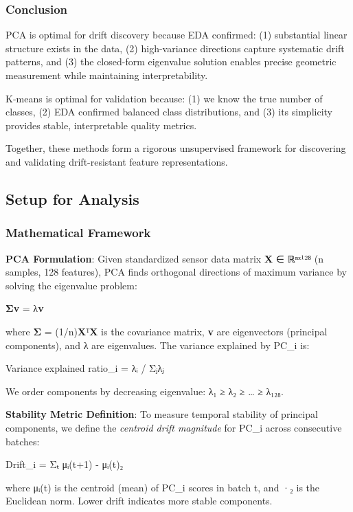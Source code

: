 \documentclass[
  letterpaper,
  DIV=11,
  numbers=noendperiod]{scrartcl}
\begin{document}
\subsubsection{Conclusion}\label{conclusion}

PCA is optimal for drift discovery because EDA confirmed: (1)
substantial linear structure exists in the data, (2) high-variance
directions capture systematic drift patterns, and (3) the closed-form
eigenvalue solution enables precise geometric measurement while
maintaining interpretability.

K-means is optimal for validation because: (1) we know the true number
of classes, (2) EDA confirmed balanced class distributions, and (3) its
simplicity provides stable, interpretable quality metrics.

Together, these methods form a rigorous unsupervised framework for
discovering and validating drift-resistant feature representations.

\subsection{Setup for Analysis}\label{setup-for-analysis}

\subsubsection{Mathematical Framework}\label{mathematical-framework}

\textbf{PCA Formulation}: Given standardized sensor data matrix
\textbf{X} ∈ ℝⁿˣ¹²⁸ (n samples, 128 features), PCA finds orthogonal
directions of maximum variance by solving the eigenvalue problem:

\textbf{Σv} = λ\textbf{v}

where \textbf{Σ} = (1/n)\textbf{X}ᵀ\textbf{X} is the covariance matrix,
\textbf{v} are eigenvectors (principal components), and λ are
eigenvalues. The variance explained by PC\_i is:

Variance explained ratio\_i = λᵢ / Σⱼλⱼ

We order components by decreasing eigenvalue: λ₁ ≥ λ₂ ≥ \ldots{} ≥ λ₁₂₈.

\textbf{Stability Metric Definition}: To measure temporal stability of
principal components, we define the \emph{centroid drift magnitude} for
PC\_i across consecutive batches:

Drift\_i = Σₜ \textbar\textbar μᵢ(t+1) - μᵢ(t)\textbar\textbar₂

where μᵢ(t) is the centroid (mean) of PC\_i scores in batch t, and
\textbar\textbar·\textbar\textbar₂ is the Euclidean norm. Lower drift
indicates more stable components.
\end{document}
